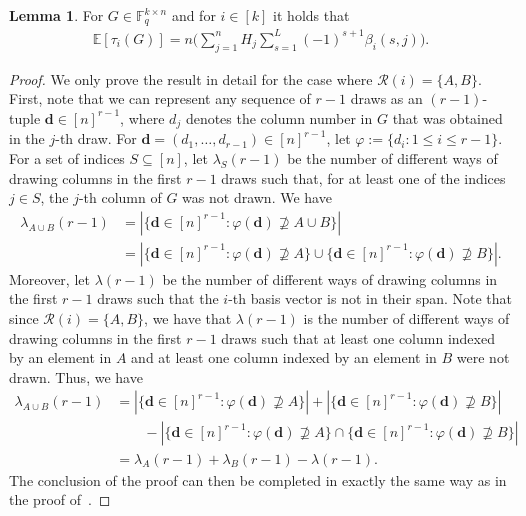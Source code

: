 \documentclass[11pt,a4paper,reqno,twoside]{amsart}
\theoremstyle{definition}
\newtheorem{lemma}{Lemma}
\newcommand{\F}{\mathbb{F}}
\newcommand{\E}{\mathbb{E}}
\newcommand{\mR}{\mathcal{R}}
\newcommand{\rcomment}[1]{{\color{red}#1}}
\newcommand{\pcomment}[1]{{\color{purple}#1}}
\newcommand{\vcomment}[1]{{\color{violet}#1}}
\newcommand{\brcomment}[1]{{\color{BrickRed}#1}}
\newcommand{\ag}[1]{{\footnotesize [\brcomment{#1}\;\;\rcomment{--Anina}]}}
\newcommand{\ey}[1]{{{\footnotesize [\pcomment{#1}\;\;\vcomment{--Eitan}]}}}
\begin{document}
\begin{lemma} \label{lem:bsj}
For $G\in \F_q^{k \times n}$ and for $i \in [k]$ it holds that
\begin{align*}
    \E[\tau_i(G)]=n \Big( \sum_{j=1}^{n} H_j\sum_{s=1}^L (-1)^{s+1} \beta_i(s,j) \Big).
\end{align*}
\end{lemma}
\begin{proof}
We only prove the result in detail for the case where $\mR(i) = \{A, B\}$.
First, note that we can represent any sequence of $r-1$ draws as an $(r-1)$-tuple $\mathbf{d} \in [n]^{r-1}$, %
where $d_j$ denotes the column number in $G$ that was obtained in the $j$-th draw.
For $\mathbf{d} = (d_1, \dots, d_{r-1}) \in [n]^{r-1}$, let $\varphi := \{d_i : 1 \le i \le r-1\}$. For a set of indices $S \subseteq [n]$, let $\lambda_{S}(r-1)$ be the number of different ways of drawing columns in the first $r-1$ draws such that, for at least one of the indices $j \in S$, the $j$-th column of $G$ was not drawn. We have
\begin{align*}
   \lambda_{A \cup B}(r-1)  &=  |\{\mathbf{d} \in [n]^{r-1} : \varphi(\mathbf{d}) \not\supseteq A \cup B\}|  \\
   &= |\{\mathbf{d} \in [n]^{r-1} : \varphi(\mathbf{d}) \not\supseteq A \} \cup \{\mathbf{d} \in [n]^{r-1} : \varphi(\mathbf{d}) \not\supseteq B\}|.
\end{align*}
Moreover, let $\lambda(r-1)$ be the number of different ways of drawing columns in the first $r-1$ draws such that the $i$-th basis vector is not in their span. Note that since $\mR(i) = \{A, B\}$, we have that $\lambda(r-1)$ is the number of different ways of drawing columns in the first $r-1$ draws such that at least one column indexed by an element in $A$ and at least one column indexed by an element in $B$ were not drawn. Thus, we have
\begin{align*}
   \lambda_{A \cup B}(r-1) 
   &= |\{\mathbf{d} \in [n]^{r-1} : \varphi(\mathbf{d}) \not\supseteq A \}| + |\{\mathbf{d} \in [n]^{r-1} : \varphi(\mathbf{d}) \not\supseteq B\}| \\
   &\qquad - |\{\mathbf{d} \in [n]^{r-1} : \varphi(\mathbf{d}) \not\supseteq A \} \cap \{\mathbf{d} \in [n]^{r-1} : \varphi(\mathbf{d}) \not\supseteq B\}| \\
   &= \lambda_{A}(r-1) + \lambda_{B}(r-1) - \lambda(r-1).
\end{align*}
The conclusion of the proof can then be completed in exactly the same way as in the proof of~\cite[Theorem 8]{bar2023cover}.


\end{proof}
\end{document}
